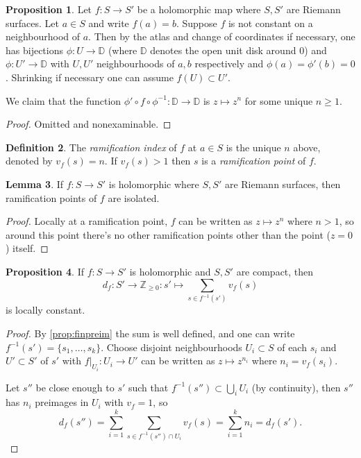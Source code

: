 \documentclass{article}
\newcommand{\D}{\mathbb{D}}
\newcommand{\Z}{\mathbb{Z}}
\theoremstyle{definition}
\newtheorem{defn}{Definition}[subsection]
\newtheorem{prop}[defn]{Proposition}
\newtheorem{lemma}[defn]{Lemma}
\begin{document}
\begin{prop}
\label{prop:zmapstozn}
Let $f:S\rightarrow S'$ be a holomorphic map where $S,S'$ are Riemann surfaces. Let $a\in S$ and write $f(a)=b$. Suppose $f$ is not constant on a neighbourhood of $a$. Then by the atlas and change of coordinates if necessary, one has bijections $\phi:U\rightarrow\D$ (where $\D$ denotes the open unit disk around 0) and $\phi:U'\rightarrow\D$ with $U,U'$ neighbourhoods of $a,b$ respectively and $\phi(a)=\phi'(b)=0$. Shrinking if necessary one can assume $f(U)\subset U'$.

We claim that the function $\phi'\circ f\circ\phi^{-1}:\D\rightarrow\D$ is $z\mapsto z^n$ for some unique $n\geq 1$.
\end{prop}
\begin{proof}
Omitted and nonexaminable.
\end{proof}

\begin{defn}
The \textit{ramification index} of $f$ at $a\in S$ is the unique $n$ above, denoted by $v_f(s)=n$. If $v_f(s)>1$ then $s$ is a \textit{ramification point} of $f$.
\end{defn}

\begin{lemma}
If $f:S\rightarrow S'$ is holomorphic where $S,S'$ are Riemann surfaces, then ramification points of $f$ are isolated.
\end{lemma}
\begin{proof}
Locally at a ramification point, $f$ can be written as $z\mapsto z^n$ where $n>1$, so around this point there's no other ramification points other than the point ($z=0$) itself.
\end{proof}

\begin{prop}
If $f:S\rightarrow S'$ is holomorphic and $S,S'$ are compact, then
\[
d_f:S'\rightarrow\Z_{\geq 0}:s'\mapsto \sum_{s\in f^{-1}(s')}v_f(s)
\]
is locally constant.
\end{prop}
\begin{proof}
By \ref{prop:finpreim} the sum is well defined, and one can write $f^{-1}(s')=\{s_1,\ldots,s_k\}$. Choose disjoint neighbourhoods $U_i\subset S$ of each $s_i$ and $U'\subset S'$ of $s'$ with $\left. f\right|_{U_i}:U_i\rightarrow U'$ can be written as $z\mapsto z^{n_i}$ where $n_i=v_f(s_i)$.

Let $s''$ be close enough to $s'$ such that $f^{-1}(s'')\subset\bigcup_iU_i$ (by continuity), then $s''$ has $n_i$ preimages in $U_i$ with $v_f=1$, so
\[
d_f(s'')=\sum_{i=1}^k\sum_{s\in f^{-1}(s'')\cap U_i} v_f(s)=\sum_{i=1}^k n_i=d_f(s').
\]
\end{proof}
\end{document}
